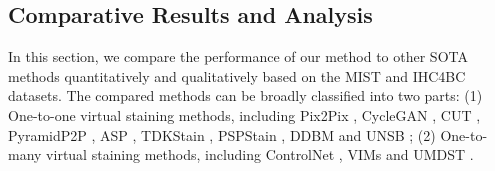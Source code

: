 \documentclass[journal,twoside,web]{ieeecolor}
\begin{document}



\subsection{Comparative Results and Analysis}
 In this section, we compare the performance of our method to other SOTA methods quantitatively and qualitatively based on the MIST and IHC4BC datasets. 
{The compared methods can be
 broadly classified into two parts: (1) One-to-one virtual staining methods, including Pix2Pix \cite{isola2017image}, CycleGAN \cite{zhu2017unpaired}, CUT \cite{park2020contrastive}, PyramidP2P
 \cite{liu2022bci}, ASP \cite{li2023adaptive}, TDKStain \cite{peng2024advancing} , PSPStain \cite{chen2024pathological}, DDBM \cite{zhou2023denoising} and UNSB \cite{kim2023unpaired};  (2) One-to-many virtual staining methods, including ControlNet \cite{zhang2023adding}, VIMs \cite{dubey2024vims} and UMDST \cite{lin2022unpaired}.}
\end{document}
